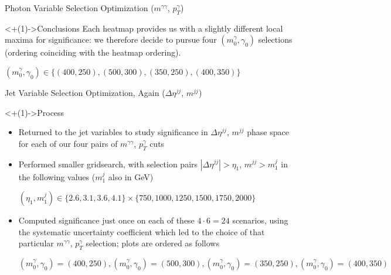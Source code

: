\documentclass[]{beamer}
\begin{document}
\begin{frame}{Photon Variable Selection Optimization ($m^{\gamma \gamma}$, $p_T^{\gamma}$)}
    \smallskip
    
    \begin{block}<+(1)->{Conclusions}
        Each heatmap provides us with a slightly different local maxima for significance: we therefore decide to pursue four $(m^\gamma_0, \gamma_0)$ selections (ordering coinciding with the heatmap ordering).
        \begin{center}
            $(m^\gamma_0, \gamma_0) \in \{(400, 250), (500, 300), (350, 250), (400, 350)\}$
        \end{center}
    \end{block}
\end{frame}

\begin{frame}{Jet Variable Selection Optimization, Again ($\Delta \eta^{jj}$, $m^{jj}$)}
    \begin{block}<+(1)->{Process}
        \begin{itemize}[<+(1)->]
            \item Returned to the jet variables to study significance in $\Delta \eta^{jj}$, $m^{jj}$ phase space for each of our four pairs of $m^{\gamma \gamma}$, $p_T^{\gamma}$ cuts           
            \item Performed smaller gridsearch, with selection pairs $|\Delta \eta^{jj}| > \eta_1$, $m^{jj} > m^j_1$ in the following values ($m^j_1$ also in GeV)
            
            \smallskip
            
            $(\eta_1, m^j_1) \in \{2.6, 3.1, 3.6, 4.1\} \times \{750, 1000, 1250, 1500, 1750, 2000\}$
            \item Computed significance just once on each of these $4 \cdot 6 = 24$ scenarios, using the systematic uncertainty coefficient which led to the choice of that particular $m^{\gamma \gamma}$, $p_T^{\gamma}$ selection; plots are ordered as follows
            
            \smallskip
            
            $(m^\gamma_0, \gamma_0) = (400, 250), (m^\gamma_0, \gamma_0) = (500, 300), (m^\gamma_0, \gamma_0) = (350, 250), (m^\gamma_0, \gamma_0) = (400, 350)$
        \end{itemize}
    \end{block}
    
    \bigskip
    

\end{frame}
\end{document}
